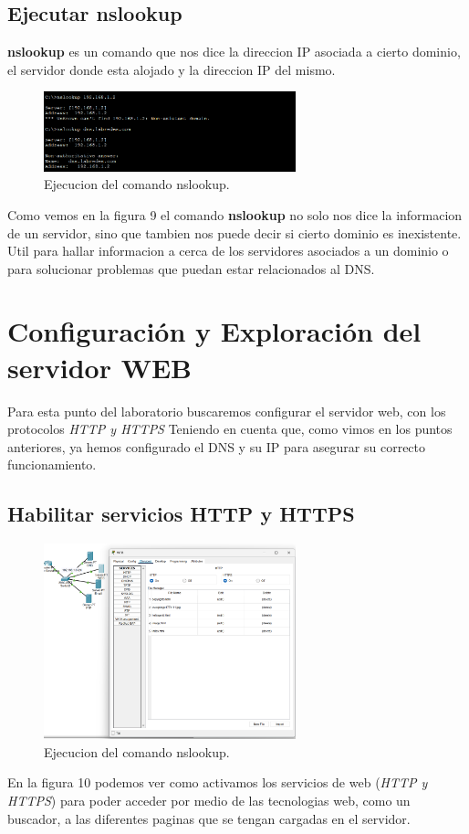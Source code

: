 \documentclass[10pt]{article}
\begin{document}
\subsection{Ejecutar nslookup}
\textbf{nslookup} es un comando que nos dice la direccion IP asociada a cierto dominio, el servidor donde esta alojado y la direccion IP del mismo. 
\begin{figure}[H]
    \centering
    \includegraphics[width=0.65\textwidth]{lab-01-screenshots/43-4-nslookup.png}
    \caption{Ejecucion del comando nslookup.}
\end{figure}
Como vemos en la figura 9 el comando \textbf{nslookup} no solo nos dice la informacion de un servidor, sino que tambien nos puede decir si cierto dominio es inexistente. Util para hallar informacion a cerca de los servidores asociados a un dominio o para solucionar problemas que puedan estar relacionados al DNS.

\section{Configuración y Exploración del servidor WEB}
Para esta punto del laboratorio buscaremos configurar el servidor web, con los protocolos \textit{HTTP y HTTPS} Teniendo en cuenta que, como vimos en los puntos anteriores, ya hemos configurado el DNS y su IP para asegurar su correcto funcionamiento.
\subsection{Habilitar servicios HTTP y HTTPS}
\begin{figure}[H]
    \centering
    \includegraphics[width=0.65\textwidth]{lab-01-screenshots/44-1-config-server.png}
    \caption{Ejecucion del comando nslookup.}
\end{figure}
En la figura 10 podemos ver como activamos los servicios de web (\textit{HTTP y HTTPS}) para poder acceder por medio de las tecnologias web, como un buscador, a las diferentes paginas que se tengan cargadas en el servidor.
\end{document}
